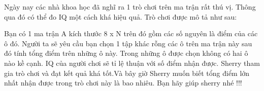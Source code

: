Ngày nay các nhà khoa học đã nghĩ ra 1 trò chơi trên ma trận rất thú vị. Thông qua đó có thể đo IQ một cách khá hiệu quả. Trò chơi được mô tả như sau:  

   Bạn có 1 ma trận A kích thước 8 x N trên đó gồm các số nguyên là điểm của các ô đó. Người ta sẽ yêu cầu bạn chọn 1 tập khác rỗng các ô trên ma trận này sau đó tính tổng điểm trên những ô này. Trong những ô được chọn không có hai ô nào kề cạnh. IQ của người chơi sẽ tỉ lệ thuận với số điểm nhận được. Sherry tham gia trò chơi và đạt kết quả khá tốt.Và bây giờ Sherry muốn biết tổng điểm lớn nhất nhận được trong trò chơi này là bao nhiêu. Bạn hãy giúp sherry nhé !!!